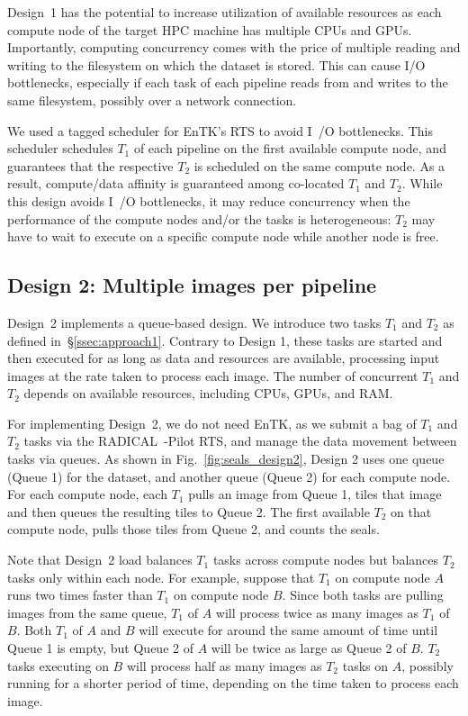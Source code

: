 Design~1 has the potential to increase utilization of available resources as 
each compute node of the target HPC machine has multiple CPUs and GPUs.
Importantly, computing concurrency comes with the price of multiple reading 
and writing to the filesystem on which the dataset is stored. This can cause 
I/O bottlenecks, especially if each task of each pipeline reads from and 
writes to the same filesystem, possibly over a network connection.

We used a tagged scheduler for EnTK's RTS to avoid I~/O bottlenecks. This 
scheduler schedules $T_{1}$ of each pipeline on the first available compute 
node, and guarantees that the respective $T_{2}$ is scheduled on the same 
compute node. As a result, compute/data affinity is guaranteed among 
co-located $T_{1}$ and $T_{2}$. While this design avoids I~/O bottlenecks, it 
may reduce concurrency when the performance of the compute nodes and/or the 
tasks is heterogeneous: $T_{2}$ may have to wait to execute on a specific 
compute node while another node is free.


\subsection{Design 2: Multiple images per pipeline}\label{ssec:approach2}

Design~2 implements a queue-based design. We introduce two tasks $T_{1}$ and 
$T_{2}$ as defined in~\S\ref{ssec:approach1}. Contrary to Design 1, these 
tasks are started and then executed for as long as data and resources are 
available, processing input images at the rate taken to process each image. 
The number of concurrent $T_{1}$ and $T_{2}$ depends on available resources, 
including CPUs, GPUs, and RAM.

For implementing Design~2, we do not need EnTK, as we submit a bag of $T_{1}$ 
and $T_{2}$ tasks via the RADICAL~-Pilot RTS, and manage the data movement 
between tasks via queues. As shown in Fig.~\ref{fig:seals_design2}, Design 2 
uses one queue (Queue 1) for the dataset, and another queue (Queue 2) for each 
compute node. For each compute node, each $T_{1}$ pulls an image from Queue 1, 
tiles that image and then queues the resulting tiles to Queue 2. The first 
available $T_{2}$ on that compute node, pulls those tiles from Queue 2, and 
counts the seals.

Note that Design~2 load balances $T_{1}$ tasks across compute nodes but  
balances $T_{2}$ tasks only within each node. For example, suppose that 
$T_{1}$ on compute node $A$ runs two times faster than $T_{1}$ on compute node 
$B$. Since both tasks are pulling images from the same queue, $T_{1}$ of $A$ 
will process twice as many images as $T_{1}$ of $B$. Both $T_{1}$ of $A$ and 
$B$ will execute for around the same amount of time until Queue 1 is empty, 
but Queue 2 of $A$ will be twice as large as Queue 2 of $B$. $T_{2}$ tasks 
executing on $B$ will process half as many images as $T_{2}$ tasks on $A$, 
possibly running for a shorter period of time, depending on the time taken to 
process each image.

